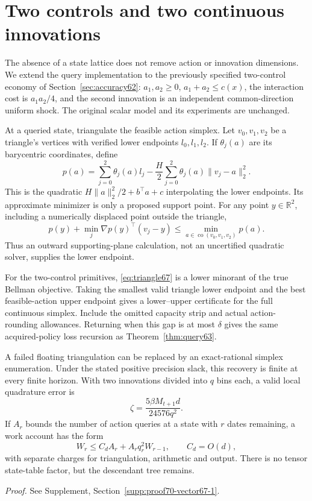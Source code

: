 \section{Two controls and two continuous innovations}\label{sec:vector67}
The absence of a state lattice does not remove action or innovation dimensions. We extend the query implementation to the previously specified two-control economy of Section~\ref{sec:accuracy62}: $a_1,a_2\ge0$, $a_1+a_2\le c(x)$, the interaction cost is $a_1a_2/4$, and the second innovation is an independent common-direction uniform shock. The original scalar model and its experiments are unchanged.

At a queried state, triangulate the feasible action simplex. Let $v_0,v_1,v_2$ be a triangle's vertices with verified lower endpoints $l_0,l_1,l_2$. If $\theta_j(a)$ are its barycentric coordinates, define
\begin{equation}\label{eq:triangle67}
 p(a)=\sum_{j=0}^2\theta_j(a)l_j
       -\frac H2\sum_{j=0}^2\theta_j(a)\|v_j-a\|_2^2.
\end{equation}
This is the quadratic $H\|a\|_2^2/2+b^\top a+c$ interpolating the lower endpoints. Its approximate minimizer is only a proposed support point. For any point $y\in\mathbb R^2$, including a numerically displaced point outside the triangle,
\begin{equation}\label{eq:dual-triangle67}
 p(y)+\min_j\nabla p(y)^\top(v_j-y)
                    \le \min_{a\in\operatorname{co}(v_0,v_1,v_2)}p(a).
\end{equation}
Thus an outward supporting-plane calculation, not an uncertified quadratic solver, supplies the lower endpoint.

\begin{theorem}\label{thm:vector67}
For the two-control primitives, \eqref{eq:triangle67} is a lower minorant of the true Bellman objective. Taking the smallest valid triangle lower endpoint and the best feasible-action upper endpoint gives a lower--upper certificate for the full continuous simplex. Include the omitted capacity strip and actual action-rounding allowances. Returning when this gap is at most $\delta$ gives the same acquired-policy loss recursion as Theorem~\ref{thm:query63}.

A failed floating triangulation can be replaced by an exact-rational simplex enumeration. Under the stated positive precision slack, this recovery is finite at every finite horizon. With two innovations divided into $q$ bins each, a valid local quadrature error is
\begin{equation}\label{eq:two-shock67}
 \zeta=\frac{5\beta M_{t+1}d}{24576q^2}.
\end{equation}
If $A_r$ bounds the number of action queries at a state with $r$ dates remaining, a work account has the form
\begin{equation}\label{eq:vector-work67}
 W_r\le C_d A_r+A_rq_r^2W_{r-1},\qquad C_d=O(d),
\end{equation}
with separate charges for triangulation, arithmetic and output. There is no tensor state-table factor, but the descendant tree remains.
\end{theorem}
\noindent\emph{Proof.} See Supplement, Section~\ref{supp:proof70-vector67-1}.


